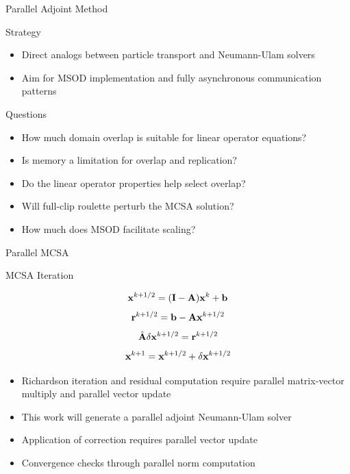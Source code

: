 \documentclass{beamer}
\begin{document}
\begin{frame}{Parallel Adjoint Method}

Strategy
  \begin{itemize}
  \item Direct analogs between particle transport and Neumann-Ulam
    solvers 
  \item Aim for MSOD implementation and fully asynchronous
    communication patterns
  \end{itemize}

Questions
  \begin{itemize}
  \item How much domain overlap is suitable for linear operator
    equations? 
  \item Is memory a limitation for overlap and replication?
  \item Do the linear operator properties help select overlap?
  \item Will full-clip roulette perturb the MCSA solution?
  \item How much does MSOD facilitate scaling?
  \end{itemize}

\end{frame}

\begin{frame}{Parallel MCSA}

  \begin{beamerboxesrounded}[upper=boxheadcolor,lower=boxbodycolor,shadow=true]
    {MCSA Iteration}

    \[
    \mathbf{x}^{k+1/2} = (\mathbf{I} - \mathbf{A})\mathbf{x}^k + \mathbf{b}
    \]
    \[
    \mathbf{r}^{k+1/2} = \mathbf{b} - \mathbf{A}\mathbf{x}^{k+1/2}
    \]
    \[
    \hat{\mathbf{A}}\delta\mathbf{x}^{k+1/2} = \mathbf{r}^{k+1/2}
    \]
    \[
    \mathbf{x}^{k+1} = \mathbf{x}^{k+1/2} + \delta \mathbf{x}^{k+1/2}
    \]

  \end{beamerboxesrounded}

  \begin{itemize}
  \item Richardson iteration and residual computation require parallel
    matrix-vector multiply and parallel vector update
  \item This work will generate a parallel adjoint Neumann-Ulam solver
  \item Application of correction requires parallel vector update
  \item Convergence checks through parallel norm computation
  \end{itemize}

\end{frame}
\end{document}
